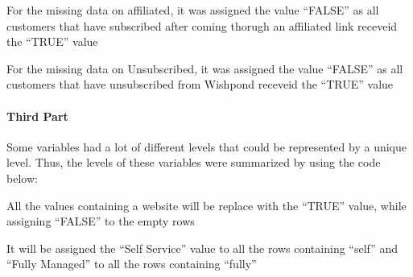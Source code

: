 \documentclass[]{article}
\newenvironment{Shaded}{\begin{snugshade}}{\end{snugshade}}
\newcommand{\KeywordTok}[1]{\textcolor[rgb]{0.13,0.29,0.53}{\textbf{#1}}}
\newcommand{\DataTypeTok}[1]{\textcolor[rgb]{0.13,0.29,0.53}{#1}}
\newcommand{\StringTok}[1]{\textcolor[rgb]{0.31,0.60,0.02}{#1}}
\newcommand{\OperatorTok}[1]{\textcolor[rgb]{0.81,0.36,0.00}{\textbf{#1}}}
\newcommand{\NormalTok}[1]{#1}
\let\oldparagraph\paragraph
\renewcommand{\paragraph}[1]{\oldparagraph{#1}\mbox{}}
\begin{document}
For the missing data on affiliated, it was assigned the value ``FALSE''
as all customers that have subscribed after coming thorugh an affiliated
link receveid the ``TRUE'' value

\begin{Shaded}
\end{Shaded}

For the missing data on Unsubscribed, it was assigned the value
``FALSE'' as all customers that have unsubscribed from Wishpond receveid
the ``TRUE'' value

\begin{Shaded}
\end{Shaded}

\paragraph{Third Part}\label{third-part}

Some variables had a lot of different levels that could be represented
by a unique level. Thus, the levels of these variables were summarized
by using the code below:

All the values containing a website will be replace with the ``TRUE''
value, while assigning ``FALSE'' to the empty rows

\begin{Shaded}
\end{Shaded}

It will be assigned the ``Self Service'' value to all the rows
containing ``self'' and ``Fully Managed'' to all the rows containing
``fully''
\end{document}
